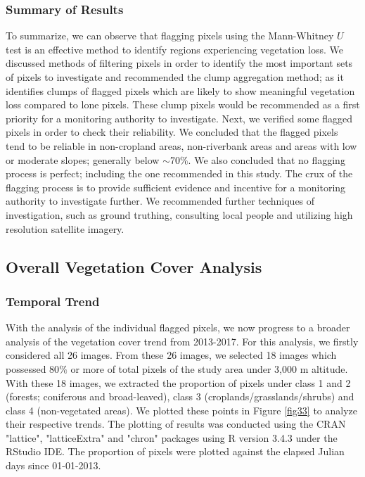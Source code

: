 \subsubsection{Summary of Results}

\justify
To summarize, we can observe that flagging pixels using the Mann-Whitney $U$ test is an effective method to identify regions experiencing vegetation loss. We discussed methods of filtering pixels in order to identify the most important sets of pixels to investigate and recommended the clump aggregation method; as it identifies clumps of flagged pixels which are likely to show meaningful vegetation loss compared to lone pixels. These clump pixels would be recommended as a first priority for a monitoring authority to investigate. Next, we verified some flagged pixels in order to check their reliability. We concluded that the flagged pixels tend to be reliable in non-cropland areas, non-riverbank areas and areas with low or moderate slopes; generally below $\sim$70$\%$. We also concluded that no flagging process is perfect; including the one recommended in this study. The crux of the flagging process is to provide sufficient evidence and incentive for a monitoring authority to investigate further. We recommended further techniques of investigation, such as ground truthing, consulting local people and utilizing high resolution satellite imagery.

\subsection{Overall Vegetation Cover Analysis}

\subsubsection{Temporal Trend}

\justify
With the analysis of the individual flagged pixels, we now progress to a broader analysis of the vegetation cover trend from 2013-2017. For this analysis, we firstly considered all 26 images. From these 26 images, we selected 18 images which possessed 80$\%$ or more of total pixels of the study area under 3,000 m altitude. With these 18 images, we extracted the proportion of pixels under class 1 and 2 (forests; coniferous and broad-leaved), class 3 (croplands/grasslands/shrubs) and class 4 (non-vegetated areas). We plotted these points in Figure \ref{fig33} to analyze their respective trends. The plotting of results was conducted using the CRAN "lattice", "latticeExtra" and "chron" packages using R version 3.4.3 under the RStudio IDE. The proportion of pixels were plotted against the elapsed Julian days since 01-01-2013. 

